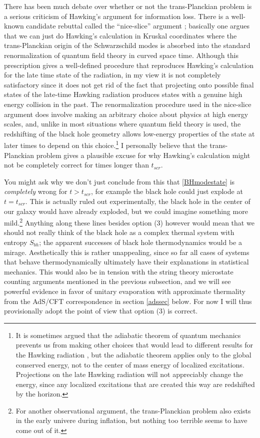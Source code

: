 \documentclass[12pt]{article}
\begin{document}
There has been much debate over whether or not the trans-Planckian problem is a serious criticism of Hawking's argument for information loss.  There is a well-known candidate rebuttal called the ``nice-slice'' argument \cite{Polchinski:1995ta}; basically one argues that we can just do Hawking's calculation in Kruskal coordinates where the trans-Planckian origin of the Schwarzschild modes is absorbed into the standard renormalization of quantum field theory in curved space time.  Although this prescription gives a well-defined procedure that reproduces Hawking's calculation for the late time state of the radiation, in my view it is not completely satisfactory since it does not get rid of the fact that projecting onto possible final states of the late-time Hawking radiation produces states with a genuine high energy collision in the past. The renormalization procedure used in the nice-slice argument does involve making an arbitrary choice about physics at high energy scales, and, unlike in most situations where quantum field theory is used, the redshifting of the black hole geometry allows low-energy properties of the state at later times to depend on this choice.\footnote{It is sometimes argued that the adiabatic theorem of quantum mechanics prevents us from making other choices that would lead to different results for the Hawking radiation \cite{Polchinski:1995ta}, but the adiabatic theorem applies only to the global conserved energy, not to the center of mass energy of localized excitations.  Projections on the late Hawking radiation will not appreciably change the energy, since any localized excitations that are created this way are redshifted by the horizon.}  I personally believe that the trans-Planckian problem gives a plausible excuse for why Hawking's calculation might not be completely correct for times longer than $t_{\mathit{scr}}$.  

You might ask why we don't just conclude from this that \eqref{BHmodestate} is \textit{completely} wrong for $t>t_{\mathit{scr}}$, for example the black hole could just explode at $t=t_{\mathit{scr}}$.  This is actually ruled out experimentally, the black hole in the center of our galaxy would have already exploded, but we could imagine something more mild.\footnote{For another observational argument, the trans-Planckian problem also exists in the early univere during inflation, but nothing too terrible seems to have come out of it.}  Anything along these lines besides option (3) however would mean that we should not really think of the black hole as a complex thermal system with entropy $S_{\mathit{bh}}$; the apparent successes of black hole thermodynamics would be a mirage.  Aesthetically this is rather unappealing, since so far all cases of systems that behave thermodynamically ultimately have their explanations in statistical mechanics.  This would also be in tension with the string theory microstate counting arguments mentioned in the previous subsection, and we will see powerful evidence in favor of unitary evaporation with approximate thermality from the AdS/CFT correspondence in section \eqref{adssec} below.  For now I will thus provisionally adopt the point of view that option (3) is correct.  
 
\end{document}

